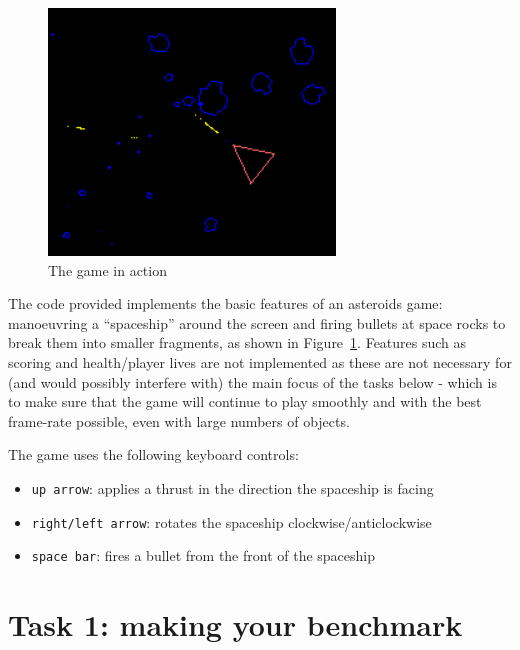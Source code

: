 \documentclass{../../../fal_assignment}
\begin{document}
\begin{figure}[ht]
	\begin{center}
		\includegraphics[width=0.5\linewidth]{asteroids}
	\end{center}
	\caption{The game in action}
	\label{fig:game}
\end{figure}

The code provided implements the basic features of an asteroids game: manoeuvring a “spaceship” around the screen and firing bullets at space rocks to break them into smaller fragments, as shown in Figure~\ref{fig:game}. Features such as scoring and health/player lives are not implemented as these are not necessary for (and would possibly interfere with) the main focus of the tasks below - which is to make sure that the game will continue to play smoothly and with the best frame-rate possible, even with large numbers of objects.

The game uses the following keyboard controls:
\begin{itemize}
	\item \lstinline{up arrow}: applies a thrust in the direction the spaceship is facing
	\item \lstinline{right/left arrow}: rotates the spaceship clockwise/anticlockwise
	\item \lstinline{space bar}: fires a bullet from the front of the spaceship
\end{itemize}

\section*{Task 1: making your benchmark}
\end{document}
